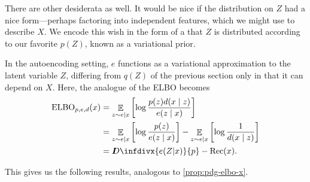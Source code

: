\documentclass{article}
\theoremstyle{plain}
\theoremstyle{definition}
\DeclareMathOperator*{\Ex}{\mathbb{E}} %
\newcommand{\thickD}{I\mkern-8muD}
\newcommand{\kldiv}{\thickD\infdivx}
\begin{document}

There are other desiderata as well. It would be nice if the distribution on $Z$ had a nice form---perhaps factoring into independent features, which we might use to describe $X$. We encode this wish in the form of a that $Z$ is distributed according to our favorite $p(Z)$, known as a variational prior.

In the autoencoding setting, $e$ functions as a variational approximation to the latent variable $Z$, differing from $q(Z)$ of the previous section only in that it can depend on $X$. Here, the analogue of the ELBO becomes
\begin{align*}
	\mathrm{ELBO}_{p,e,d}(x) &= \Ex_{z \sim e|x} \left[\log \frac{p(z) d(x\mid z)}{e(z\mid x)} \right] \\
		&= \Ex_{z \sim e|x}\left[ \log \frac{p(z)}{e(z\mid x)}  \right] - \Ex_{z \sim e|x} \left[\log \frac1{d(x\mid z)} \right] \\
		&= \kldiv{e(Z|x)}{p} - \mathrm{Rec}(x).
\end{align*}

This gives us the following results, analogous to \cref{prop:pdg-elbo-x}.
\end{document}
